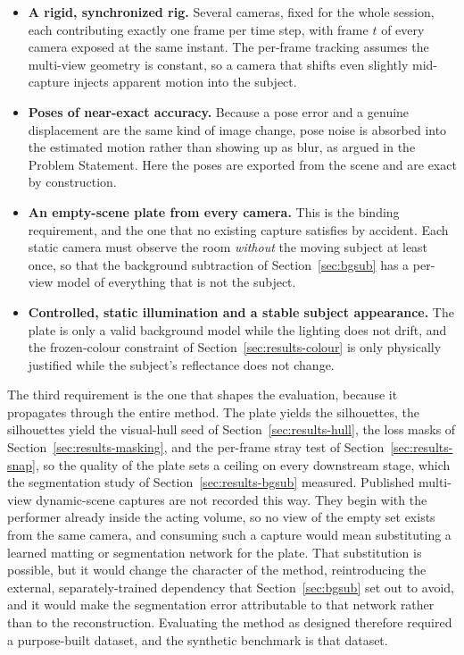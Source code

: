 \begin{itemize}
    \item \textbf{A rigid, synchronized rig.} Several cameras, fixed for the
    whole session, each contributing exactly one frame per time step, with frame
    $t$ of every camera exposed at the same instant. The per-frame tracking
    assumes the multi-view geometry is constant, so a camera that shifts even
    slightly mid-capture injects apparent motion into the subject.

    \item \textbf{Poses of near-exact accuracy.} Because a pose error and a
    genuine displacement are the same kind of image change, pose noise is
    absorbed into the estimated motion rather than showing up as blur, as argued
    in the Problem Statement. Here the poses are exported from the scene and are
    exact by construction.

    \item \textbf{An empty-scene plate from every camera.} This is the binding
    requirement, and the one that no existing capture satisfies by accident. Each
    static camera must observe the room \emph{without} the moving subject at
    least once, so that the background subtraction of
    Section~\ref{sec:bgsub} has a per-view model of everything that is not the
    subject.

    \item \textbf{Controlled, static illumination and a stable subject
    appearance.} The plate is only a valid background model while the lighting
    does not drift, and the frozen-colour constraint of
    Section~\ref{sec:results-colour} is only physically justified while the
    subject's reflectance does not change.
\end{itemize}

The third requirement is the one that shapes the evaluation, because it
propagates through the entire method. The plate yields the silhouettes, the
silhouettes yield the visual-hull seed of Section~\ref{sec:results-hull}, the
loss masks of Section~\ref{sec:results-masking}, and the per-frame stray test of
Section~\ref{sec:results-snap}, so the quality of the plate sets a ceiling on
every downstream stage, which the segmentation study of
Section~\ref{sec:results-bgsub} measured. Published multi-view dynamic-scene
captures are not recorded this way. They begin with the performer already inside
the acting volume, so no view of the empty set exists from the same camera, and
consuming such a capture would mean substituting a learned matting or
segmentation network for the plate. That substitution is possible, but it would
change the character of the method, reintroducing the external,
separately-trained dependency that Section~\ref{sec:bgsub} set out to avoid, and
it would make the segmentation error attributable to that network rather than to
the reconstruction. Evaluating the method as designed therefore required a
purpose-built dataset, and the synthetic benchmark is that dataset.

